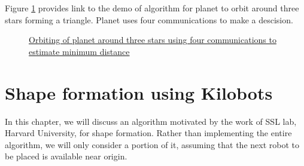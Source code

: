\documentclass{report}[12pt]
\begin{document}
Figure \ref{fig:orbit_three_stars} provides link to the demo of algorithm for planet to orbit around three stars forming a triangle. Planet uses four communications to make a descision.
\begin{figure}[H]
    \centering
    \caption{\href{https://youtu.be/5aZm0Os9BPc}{Orbiting of planet around three stars using four communications to estimate minimum distance}}
    \label{fig:orbit_three_stars}
\end{figure}

\chapter{Shape formation using Kilobots}
In this chapter, we will discuss an algorithm motivated by the work \cite{MR-AC-RN:2014} of SSL lab, Harvard University, for shape formation. Rather than implementing the entire algorithm, we will only consider a portion of it, assuming that the next robot to be placed is available near origin.
\end{document}
